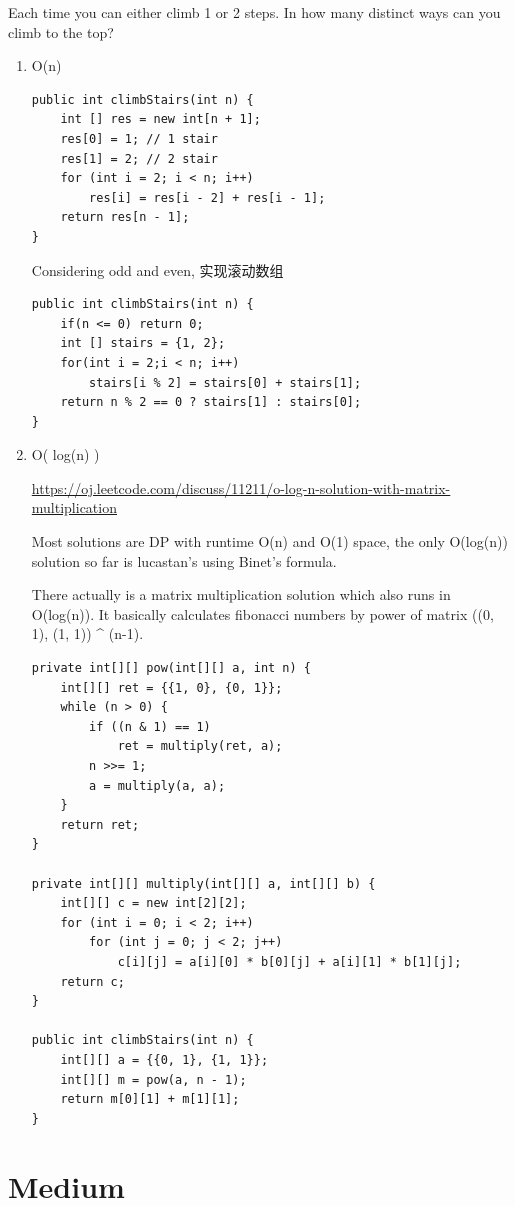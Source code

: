 \documentclass[12pt]{book}
\begin{document}
Each time you can either climb 1 or 2 steps. In how many distinct ways
can you climb to the top?
\begin{enumerate}
\item O(n)
\label{sec-14-1-1-1}
\lstset{language=java,label= ,caption= ,numbers=none}
\begin{lstlisting}
public int climbStairs(int n) {
    int [] res = new int[n + 1];
    res[0] = 1; // 1 stair
    res[1] = 2; // 2 stair
    for (int i = 2; i < n; i++) 
        res[i] = res[i - 2] + res[i - 1];
    return res[n - 1];
}
\end{lstlisting}

Considering odd and even, 实现滚动数组
\lstset{language=java,label= ,caption= ,numbers=none}
\begin{lstlisting}
public int climbStairs(int n) {
    if(n <= 0) return 0;
    int [] stairs = {1, 2};
    for(int i = 2;i < n; i++)
        stairs[i % 2] = stairs[0] + stairs[1];
    return n % 2 == 0 ? stairs[1] : stairs[0];
}
\end{lstlisting}
\item O( log(n) )
\label{sec-14-1-1-2}

\url{https://oj.leetcode.com/discuss/11211/o-log-n-solution-with-matrix-multiplication}

Most solutions are DP with runtime O(n) and O(1) space, the only O(log(n)) solution so far is lucastan's using Binet's formula.

There actually is a matrix multiplication solution which also runs in O(log(n)). It basically calculates fibonacci numbers by power of matrix ((0, 1), (1, 1)) \^{} (n-1).

\lstset{language=java,label= ,caption= ,numbers=none}
\begin{lstlisting}
private int[][] pow(int[][] a, int n) {
    int[][] ret = {{1, 0}, {0, 1}};
    while (n > 0) {
        if ((n & 1) == 1) 
            ret = multiply(ret, a);
        n >>= 1;
        a = multiply(a, a);
    }
    return ret;
}

private int[][] multiply(int[][] a, int[][] b) {
    int[][] c = new int[2][2];
    for (int i = 0; i < 2; i++) 
        for (int j = 0; j < 2; j++) 
            c[i][j] = a[i][0] * b[0][j] + a[i][1] * b[1][j];
    return c;
}

public int climbStairs(int n) {
    int[][] a = {{0, 1}, {1, 1}};
    int[][] m = pow(a, n - 1);
    return m[0][1] + m[1][1];
}
\end{lstlisting}
\end{enumerate}
\section{Medium}
\label{sec-14-2}
\end{document}
